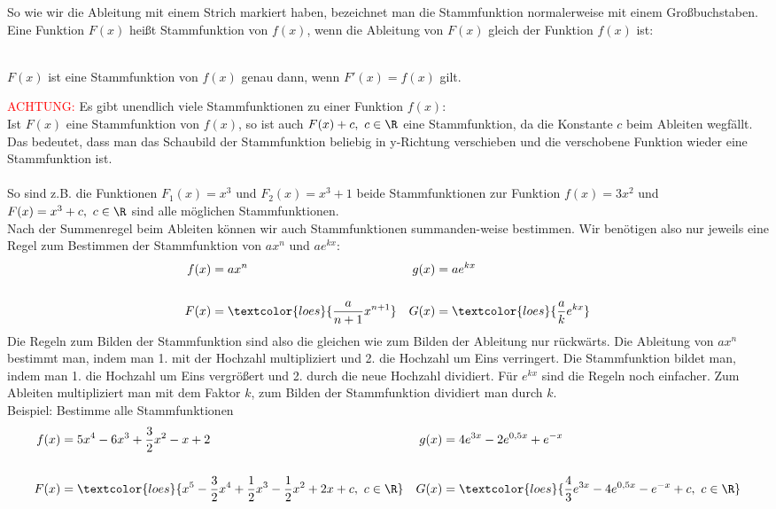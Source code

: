 So wie wir die Ableitung mit einem Strich markiert haben, bezeichnet man die Stammfunktion normalerweise mit einem Großbuchstaben. Eine Funktion \(F(x)\) heißt Stammfunktion von \(f(x)\), wenn die Ableitung von \(F(x)\) gleich der Funktion \(f(x)\) ist:
\begin{tcolorbox}
	\phantom{A}\\
	\textcolor{loestc}{\(F(x)\) ist eine Stammfunktion von \(f(x)\) genau dann, wenn \(F'(x)=f(x)\) gilt.}\\
\end{tcolorbox}
\textcolor{red}{ACHTUNG:} Es gibt unendlich viele Stammfunktionen zu einer Funktion \(f(x)\):\\
\textcolor{loes}{Ist \(F(x)\) eine Stammfunktion von \(f(x)\), so ist auch \(F(x)+c,\ c\in\R\) eine Stammfunktion, da die Konstante \(c\) beim Ableiten wegfällt. Das bedeutet, dass man das Schaubild der Stammfunktion beliebig in y-Richtung verschieben und die verschobene Funktion wieder eine Stammfunktion ist.}\\ \\
So sind z.B. die Funktionen \(F_1(x)=x^3\) und \(F_2(x)=x^3+1\) beide Stammfunktionen zur Funktion \(f(x)=3x^2\) und \(F(x)=x^3+c,\ c\in\R\) sind alle möglichen Stammfunktionen.\\
Nach der Summenregel beim Ableiten können wir auch Stammfunktionen summanden-weise bestimmen. Wir benötigen also nur jeweils eine Regel zum Bestimmen der Stammfunktion von \(ax^n\) und \(ae^{kx}\):
\begin{align*}
	f(x)&=ax^n & g(x)&=ae^{kx}\\
	 \\
	F(x)&=\textcolor{loes}{\frac{a}{n+1}x^{n+1}} &	G(x)&=\textcolor{loes}{\frac{a}{k}e^{kx}}\\
\end{align*}
Die Regeln zum Bilden der Stammfunktion sind also die gleichen wie zum Bilden der Ableitung nur rückwärts. Die Ableitung von \(ax^n\) bestimmt man, indem man 1. mit der Hochzahl multipliziert und 2. die Hochzahl um Eins verringert. Die Stammfunktion bildet man, indem man 1. die Hochzahl um Eins vergrößert und 2. durch die neue Hochzahl dividiert. Für \(e^{kx}\) sind die Regeln noch einfacher. Zum Ableiten multipliziert man mit dem Faktor \(k\), zum Bilden der Stammfunktion dividiert man durch \(k\).\\
Beispiel: Bestimme alle Stammfunktionen\\
\begin{align*}
	f(x)&=5x^4-6x^3+\frac{3}{2}x^2-x+2 & g(x)&=4e^{3x}-2e^{0,5x}+e^{-x}\\
	\\
	F(x)&=\textcolor{loes}{x^5-\frac{3}{2}x^4+\frac{1}{2}x^3-\frac{1}{2}x^2+2x+c,\ c\in\R} &	G(x)&=\textcolor{loes}{\frac{4}{3}e^{3x}-4e^{0,5x}-e^{-x}+c,\ c\in\R}\\
\end{align*}
